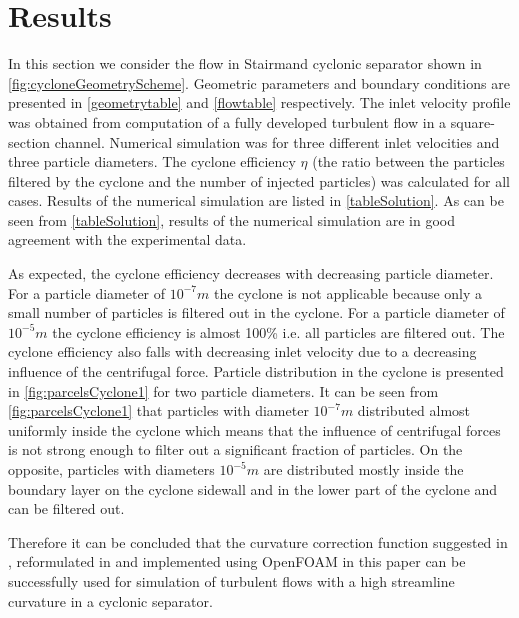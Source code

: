 \documentclass[a4paper]{jpconf}
\begin{document}
\section{Results}

In this section we consider the flow in Stairmand cyclonic separator \cite{Stairmand} shown in \cref{fig:cycloneGeometryScheme}. Geometric parameters and boundary conditions are presented in \cref{geometrytable} and \cref{flowtable} respectively. The inlet velocity profile was obtained from computation of a fully developed turbulent flow in a square-section channel. Numerical simulation was for three different inlet velocities and three particle diameters. The cyclone efficiency $\eta$ (the ratio between the particles filtered by the cyclone and the number of injected particles) was calculated for all cases. Results of the numerical simulation are listed in \cref{tableSolution}. As can be seen from \cref{tableSolution}, results of the numerical simulation are in good agreement with the experimental data.

As expected, the cyclone efficiency decreases with decreasing particle diameter. For a particle diameter of $10^{-7}m$ the cyclone is not applicable because only a small number of particles is filtered out in the cyclone. For a particle diameter of $10^{-5}m$ the cyclone efficiency is almost 100\% i.e. all particles are filtered out. The cyclone efficiency also falls with decreasing inlet velocity due to a decreasing influence of the centrifugal force. Particle distribution in the cyclone is presented in \cref{fig:parcelsCyclone1} for two particle diameters. It can be seen from \cref{fig:parcelsCyclone1} that particles with diameter $10^{-7}m$ distributed almost uniformly inside the cyclone which means that the influence of centrifugal forces is not strong enough to filter out a significant fraction of particles. On the opposite, particles with diameters $10^{-5}m$ are distributed mostly inside the boundary layer on the cyclone sidewall and in the lower part of the cyclone and can be filtered out.

Therefore it can be concluded that the curvature correction function suggested in \cite{ShurSpallart}, reformulated in \cite{Smirnov} and implemented using OpenFOAM in this paper can be successfully used for simulation of turbulent flows with a high streamline curvature in a cyclonic separator.
\end{document}
